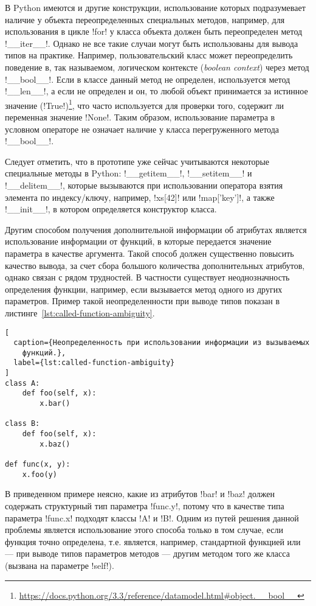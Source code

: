 В Python имеются и другие конструкции, использование которых подразумевает
наличие у объекта переопределенных специальных методов, например, для
использования в цикле !for! у класса объекта должен быть переопределен метод
!__iter__!. Однако не все такие случаи могут быть использованы для вывода типов
на практике. Например, пользовательский класс может переопределить поведение в,
так называемом, логическом контексте (\emph{boolean context}) через метод
!__bool__!. Если в классе данный метод не определен, используется метод
!__len__!, а если не определен и он, то любой объект принимается за истинное
значение
(!True!)\footnote{\url{https://docs.python.org/3.3/reference/datamodel.html\#object.\_\_bool\_\_}},
что часто используется для проверки того, содержит ли переменная значение
!None!. Таким образом, использование параметра в условном операторе не означает
наличие у класса перегруженного метода !__bool__!.

Следует отметить, что в прототипе уже сейчас учитываются некоторые специальные
методы в Python: !__getitem__!, !__setitem__! и !__delitem__!,
которые вызываются при использовании оператора взятия элемента по индексу/ключу,
например, !xs[42]! или !map['key']!, а также !__init__!, в котором определяется
конструктор класса.

Другим способом получения дополнительной информации об атрибутах является
использование информации от функций, в которые передается значение параметра в
качестве аргумента. Такой способ должен существенно повысить качество вывода, за
счет сбора большого количества дополнительных атрибутов, однако связан с рядом
трудностей. В частности существует неоднозначность определения функции,
например, если вызывается метод одного из других параметров. Пример такой
неопределенности при выводе типов показан в
листинге~\ref{lst:called-function-ambiguity}.

\begin{lstlisting}[
  caption={Неопределенность при использовании информации из вызываемых
    функций.},
  label={lst:called-function-ambiguity}
]
class A:
    def foo(self, x):
        x.bar()

class B:
    def foo(self, x):
        x.baz()

def func(x, y):
    x.foo(y)
\end{lstlisting}

В приведенном примере неясно, какие из атрибутов !bar! и !baz! должен содержать
структурный тип параметра !func.y!, потому что в качестве типа параметра
!func.x! подходят классы !A! и !B!. Одним из путей решения данной проблемы
является использование этого способа только в том случае, если функция точно
определена, т.е. является, например, стандартной функцией или --- при выводе
типов параметров методов --- другим методом того же класса (вызвана на параметре
!self!).

